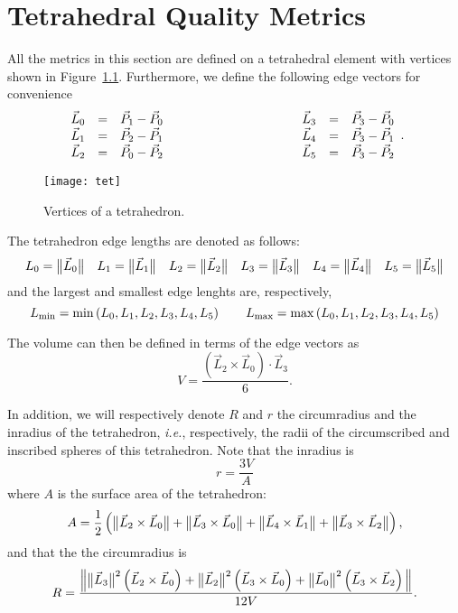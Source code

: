 \chapter{Tetrahedral Quality Metrics}

All the metrics in this section are defined on a tetrahedral element with vertices
shown in Figure~\ref{f:tet}. Furthermore, we define the following edge vectors for
convenience
\begin{equation*}
\begin{array}{lcl}
\vec L_0 &=& \vec P_1 - \vec P_0\\
\vec L_1 &=& \vec P_2 - \vec P_1\\
\vec L_2 &=& \vec P_0 - \vec P_2
\end{array}\rule{10em}{0pt}
\begin{array}{lcl}
\vec L_3 &=& \vec P_3 - \vec P_0\\
\vec L_4 &=& \vec P_3 - \vec P_1\\
\vec L_5 &=& \vec P_3 - \vec P_2
\end{array}.
\end{equation*}

\begin{figure}[htb]
  \begin{center}
    \texttt{[image: tet]}
    \caption{Vertices of a tetrahedron.%
                                                                  \label{f:tet}}
  \end{center}
\end{figure}

The tetrahedron edge lengths are denoted as follows:
\[
L_0 = \big\lVert{\vec L_0}\big\rVert\quad
L_1 = \big\lVert{\vec L_1}\big\rVert\quad
L_2 = \big\lVert{\vec L_2}\big\rVert\quad
L_3 = \big\lVert{\vec L_3}\big\rVert\quad
L_4 = \big\lVert{\vec L_4}\big\rVert\quad
L_5 = \big\lVert{\vec L_5}\big\rVert
\]
and the largest and smallest edge lenghts are, respectively,
\[
L_{\min} = \min\left(L_0, L_1, L_2, L_3, L_4, L_5\right)
  \rule{2em}{0pt}
L_{\max} = \max\left(L_0, L_1, L_2, L_3, L_4, L_5\right)
\]

The volume can then be defined in terms of the edge vectors as
\begin{equation*}
V = \frac{\left(\vec L_2\times\vec L_0\right)\cdot\vec L_3 }{6}.
\end{equation*}

In addition, we will respectively denote $R$ and $r$ the circumradius
and the inradius of the tetrahedron, \emph{i.e.}, respectively, the radii
of the circumscribed and inscribed spheres of this tetrahedron.
Note that the inradius is
\[
 r = \frac { 3V } { A }
\]
where $A$ is the  surface area of the tetrahedron:
\[
A = \frac{1}{2} \left(
      \big\lVert{\vec L_2 \times \vec L_0}\big\rVert + 
      \big\lVert{\vec L_3 \times \vec L_0}\big\rVert + 
      \big\lVert{\vec L_4 \times \vec L_1}\big\rVert + 
      \big\lVert{\vec L_3 \times \vec L_2}\big\rVert  \right),
\]
and that the the circumradius is
\[
 R = \frac {\Big\lVert
   \big\lVert{\vec L_3}\big\rVert^2 \left( \vec L_2 \times \vec L_0 \right) + 
   \big\lVert{\vec L_2}\big\rVert^2 \left( \vec L_3 \times \vec L_0 \right) + 
   \big\lVert{\vec L_0}\big\rVert^2 \left( \vec L_3 \times \vec L_2 \right)
   \Big\rVert}{12 V }. 
\]

